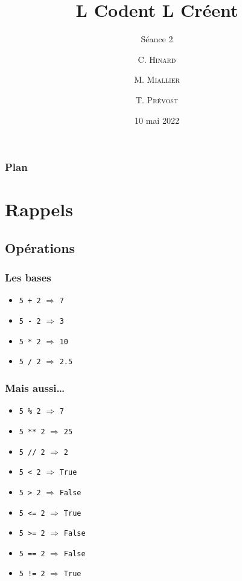 \documentclass{beamer}
\title %
{L Codent L Créent}
\subtitle{Séance 2}
\author[ENSTA Bretagne] %
{C. \textsc{Hinard} \and M. \textsc{Miallier} \and T. \textsc{Prévost}}
\institute[] %
{
  ENSTA Bretagne
  \and
  Collège Croas Ar'Pennoc
}
\date[Séance 2] %
{10 mai 2022}
\begin{document}
\frame{\titlepage}


\begin{frame}
\frametitle{Plan}
\tableofcontents
\end{frame}


\section{Rappels}\label{sec:rappels}
   \subsection{Opérations}\label{subsec:operations}

\begin{frame}
\frametitle{Les bases}

\begin{itemize}
    \item<1-> \texttt{5 + 2} $\Longrightarrow$ \pause \texttt{7} \pause
    \item<2-> \texttt{5 - 2} $\Longrightarrow$ \pause \texttt{3} \pause
    \item<3-> \texttt{5 * 2} $\Longrightarrow$ \pause \texttt{10} \pause
    \item<4-> \texttt{5 / 2} $\Longrightarrow$ \pause \texttt{2.5}

\end{itemize}
\end{frame}

\begin{frame}
\frametitle{Mais aussi\dots}

\begin{itemize}%
   \item<1-> \texttt{5 \% 2} $\Longrightarrow$ \pause \texttt{7} \pause
   \item<2-> \texttt{5 ** 2} $\Longrightarrow$ \pause \texttt{25} \pause
   \item<3-> \texttt{5 // 2} $\Longrightarrow$ \pause \texttt{2} \pause
   \item<4-> \texttt{5 < 2} $\Longrightarrow$ \pause \texttt{True} \pause
   \item<5-> \texttt{5 > 2} $\Longrightarrow$ \pause \texttt{False} \pause
   \item<6-> \texttt{5 <= 2} $\Longrightarrow$ \pause \texttt{True} \pause
   \item<7-> \texttt{5 >= 2} $\Longrightarrow$ \pause \texttt{False} \pause
   \item<8-> \texttt{5 == 2} $\Longrightarrow$ \pause \texttt{False} \pause
   \item<9-> \texttt{5 != 2} $\Longrightarrow$ \pause \texttt{True} \pause
\end{itemize}
\end{frame}
\end{document}
